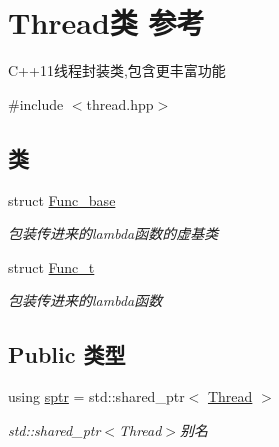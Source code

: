 \hypertarget{classThread}{}\section{Thread类 参考}
\label{classThread}


C++11线程封装类,包含更丰富功能  




{\ttfamily \#include $<$thread.\+hpp$>$}

\subsection*{类}
\begin{DoxyCompactItemize}
\item 
struct \hyperlink{structThread_1_1Func__base}{Func\+\_\+base}
\begin{DoxyCompactList}\small\item\em 包装传进来的lambda函数的虚基类 \end{DoxyCompactList}\item 
struct \hyperlink{structThread_1_1Func__t}{Func\+\_\+t}
\begin{DoxyCompactList}\small\item\em 包装传进来的lambda函数 \end{DoxyCompactList}\end{DoxyCompactItemize}
\subsection*{Public 类型}
\begin{DoxyCompactItemize}
\item 
\mbox{\label{classThread_a430059e402325caaf1ed185fb520c9d2}} 
using \hyperlink{classThread_a430059e402325caaf1ed185fb520c9d2}{sptr} = std\+::shared\+\_\+ptr$<$ \hyperlink{classThread}{Thread} $>$
\begin{DoxyCompactList}\small\item\em std\+::shared\+\_\+ptr$<$\+Thread$>$别名 \end{DoxyCompactList}\end{DoxyCompactItemize}

